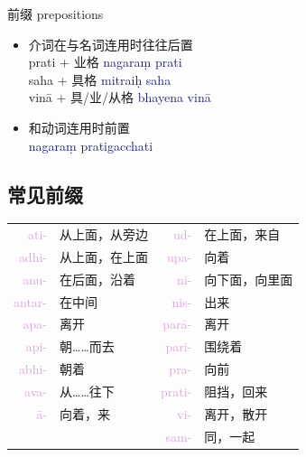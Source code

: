 \documentclass[17pt]{beamer}
\newcommand{\fullpada}[1]{\textcolor{OliveGreen}{#1}}
\newcommand{\pratyaya}[1]{\textcolor{Plum}{#1}}
\newcommand{\fullsentence}[1]{\textcolor{MidnightBlue}{#1}}
\begin{document}
\begin{frame}{前缀 prepositions}
  \begin{itemize}
    \item 介词在与名词连用时往往后置 \\
    \fullpada{prati} + 业格 \fullsentence{nagaraṃ prati} \\
    \fullpada{saha} + 具格 \fullsentence{mitraiḥ saha} \\
    \fullpada{vinā} + 具/业/从格 \fullsentence{bhayena vinā} \\
    \item 和动词连用时前置 \\   
    \fullsentence{nagaraṃ pratigacchati} \\
  \end{itemize}
\end{frame}

\subsection{常见前缀}
\begin{frame}{\insertsubsection }
  \small
  \centering
    \begin{tabular}{@{}rlrl@{}} %
      \pratyaya{ati\nobreakdash-} & 从上面，从旁边 & \pratyaya{ud\nobreakdash-} & 在上面，来自  \\
      \pratyaya{adhi\nobreakdash-} & 从上面，在上面  & \pratyaya{upa\nobreakdash-} & 向着   \\
      \pratyaya{anu\nobreakdash-} & 在后面，沿着 & \pratyaya{ni\nobreakdash-} & 向下面，向里面 \\
      \pratyaya{antar\nobreakdash-} & 在中间 & \pratyaya{nis\nobreakdash-} & 出来 \\
      \pratyaya{apa\nobreakdash-} & 离开 & \pratyaya{parā\nobreakdash-} & 离开 \\
      \pratyaya{api\nobreakdash-} & 朝……而去 & \pratyaya{pari\nobreakdash-} & 围绕着 \\
      \pratyaya{abhi\nobreakdash-} & 朝着 & \pratyaya{pra\nobreakdash-} & 向前 \\
      \pratyaya{ava\nobreakdash-} & 从……往下 & \pratyaya{prati\nobreakdash-} & 阻挡，回来 \\
      \pratyaya{ā\nobreakdash-} & 向着，来 & \pratyaya{vi\nobreakdash-} & 离开，散开 \\
       &  & \pratyaya{sam\nobreakdash-} & 同，一起 \\
    \end{tabular}
\end{frame}
\end{document}
